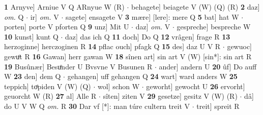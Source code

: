 \documentclass[8pt,a4paper,notitlepage]{article}
\begin{document}
\begin{table}[ht]
\begin{minipage}[t]{0.5\linewidth}
\textbf{1} Arnyve] Arniue V Q ARnyue W (R)  $\cdot$ behagete] beiagete V (W) (Q) (R) \textbf{2} daz] \textit{om.} Q  $\cdot$ ir] \textit{om.} V  $\cdot$ sagete] ensagete V \textbf{3} mære] [lere]: mere Q \textbf{5} bat] hat W  $\cdot$ porten] porte V pforten Q \textbf{9} unz] Mit U  $\cdot$ daz] \textit{om.} V  $\cdot$ gespreche] bespreche W \textbf{10} kunst] kunt Q  $\cdot$ daz] das ich Q \textbf{11} doch] Do Q \textbf{12} vrâgen] frage R \textbf{13} herzoginne] herczoginen R \textbf{14} pflac ouch] pfagk Q \textbf{15} des] daz U V R  $\cdot$ gewuoc] gewuͦt R \textbf{16} Gawan] herr gawan W \textbf{18} sînen art] sin art V (W) [sin*]: sin art  R \textbf{19} Busûnær] Besuͦnder U Bvsvne V Busunen R  $\cdot$ ander] andern U \textbf{20} ûf] Do auff W \textbf{23} den] dem Q  $\cdot$ gehangen] uff gehangen Q \textbf{24} wart] ward anders W \textbf{25} teppich] toͤpiden V (W) (Q)  $\cdot$ wol] schon W  $\cdot$ geworht] gewocht U \textbf{26} ervorht] geuorcht W (R) \textbf{27} al] Alle R  $\cdot$ sîten] ziten V \textbf{29} gesetze] gesitz V (W) (R)  $\cdot$ dâ] do U V W Q \textit{om.} R \textbf{30} Dar vf [*]: man túre cultern treit V  $\cdot$ treit] spreit R \newline
\end{minipage}
\end{table}
\end{document}
